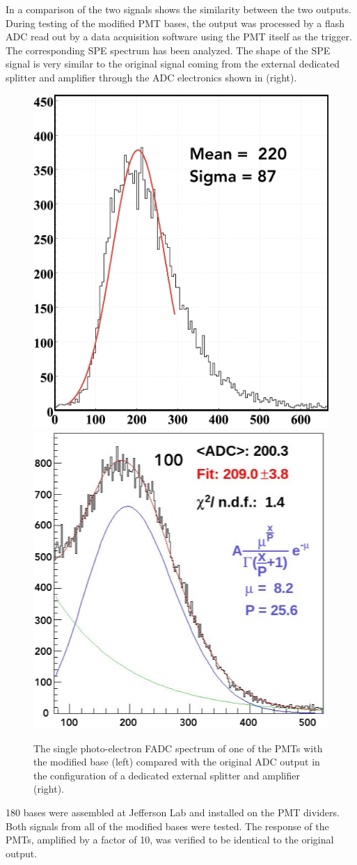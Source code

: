 In  a comparison of the two signals shows the similarity between the two outputs.
During testing of the modified PMT bases, the output was processed by a flash ADC read out by a data
acquisition software using the PMT itself as the trigger.
The corresponding SPE spectrum has been analyzed. The shape of the SPE signal is very similar to the original signal
coming from the external dedicated splitter and amplifier through the ADC electronics shown in  (right).

\begin{figure}
	\centering
	\includegraphics[width=0.47\columnwidth,height=0.75\columnwidth]{img/fadcOutput.png}
	\includegraphics[width=0.47\columnwidth,height=0.75\columnwidth]{img/cc_signal.png}
	\caption{The single photo-electron FADC spectrum of one of the PMTs with the modified base (left) compared with the original ADC output in the
            configuration of a dedicated external splitter and amplifier (right). }
	\label{fig:dividerTests}
\end{figure}

180 bases were assembled at Jefferson Lab and installed on the PMT dividers. Both signals from all of the modified bases were tested.
The response of the PMTs, amplified by a factor of 10, was verified to be identical to the original output.


